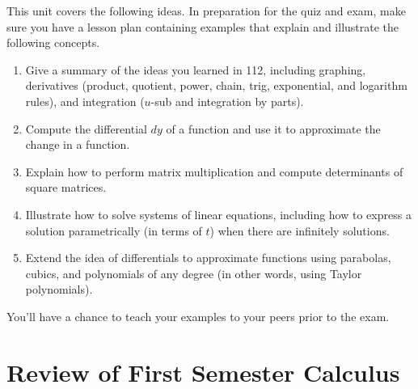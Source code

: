 This unit covers the following ideas. In preparation for the quiz and exam, make sure you have a lesson plan containing examples that explain and illustrate the following concepts.  \begin{enumerate}
\item Give a summary of the ideas you learned in 112, including graphing, derivatives (product, quotient, power, chain, trig, exponential, and logarithm rules), and integration ($u$-sub and integration by parts).
\item Compute the differential $dy$ of a function and use it to approximate the change in a function. 
\item Explain how to perform matrix multiplication and compute determinants of square matrices.
\item Illustrate how to solve systems of linear equations, including how to express a solution parametrically (in terms of $t$) when there are infinitely solutions.
\item Extend the idea of differentials to approximate functions using parabolas, cubics, and polynomials of any degree (in other words, using Taylor polynomials).
\end{enumerate}
You'll have a chance to teach your examples to your peers prior to the exam.

%

\section{Review of First Semester Calculus}

